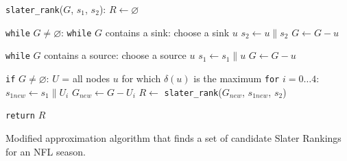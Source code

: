 \documentclass[11pt]{article}
\begin{document}
\begin{algorithm}[!htb]
\texttt{slater\_rank}($G$, $s_1$, $s_2$):\newline
\hspace*{2em} $R \gets \varnothing$\newline

\hspace*{2em} \texttt{while} $G \ne \varnothing$:\newline
\hspace*{4em} \texttt{while} $G$ contains a sink:\newline
\hspace*{6em} choose a sink $u$\newline
\hspace*{6em} $s_2 \gets u \parallel s_2$\newline
\hspace*{6em} $G \gets G - u$\newline

\hspace*{4em} \texttt{while} $G$ contains a source:\newline
\hspace*{6em} choose a source $u$\newline
\hspace*{6em} $s_1 \gets s_1 \parallel u$\newline
\hspace*{6em} $G \gets G - u$\newline

\hspace*{4em} \texttt{if} $G \ne \varnothing$:\newline
\hspace*{6em} $U$ = all nodes $u$ for which $\delta(u)$ is the maximum\newline
\hspace*{6em} \texttt{for} $i = 0 \ldots 4$:\newline
\hspace*{8em} $s_{1 new} \gets s_1 \parallel U_i$\newline
\hspace*{8em} $G_{new} \gets G - U_i$\newline
\hspace*{8em} $R \gets$ \texttt{slater\_rank}($G_{new}$, $s_{1new}$, $s_2$)\newline

\hspace*{2em} \texttt{return} $R$\newline
\caption{Modified approximation algorithm that finds a set of candidate Slater Rankings for an NFL season.}\label{algo:slater_ranking}
\end{algorithm}
\end{document}

